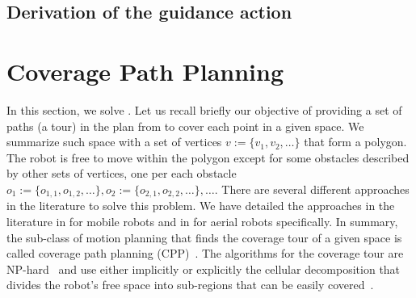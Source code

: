 \subsection{\color{red}Derivation of the guidance action}


\section{Coverage Path Planning}
\label{sec:cov-path-plan}

In this section, we solve . Let us recall briefly our objective of providing a set of paths (a tour) in the plan from  to cover each point in a given space. We summarize such space with a set of vertices $v:=\{v_1,v_2,\dots\}$ that form a polygon. The robot is free to move within the polygon except for some obstacles described by other sets of vertices, one per each obstacle $o_1:=\{o_{1,1},o_{1,2},\dots\},o_2:=\{o_{2,1},o_{2,2},\dots\},\dots$. There are several different approaches in the literature to solve this problem. We have detailed the approaches in the literature in  for mobile robots and in  for aerial robots specifically. In summary, the sub-class of motion planning that finds the coverage tour of a given space is called coverage path planning (CPP)~\citep{choset1998coverage}. The algorithms for the coverage tour are NP-hard~\citep{arkin2000approximation} and use either implicitly or explicitly the cellular decomposition that divides the robot's free space into sub-regions that can be easily covered~\citep{choset2001coverage,galceran2013survey}.

